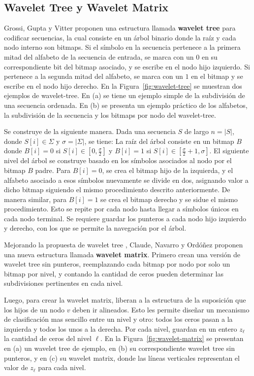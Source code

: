\subsection{Wavelet Tree y Wavelet Matrix}
Grossi, Gupta y Vitter \cite{grossi2003high} proponen una estructura llamada \textbf{wavelet tree} para codificar secuencias, la cual consiste en un árbol binario donde la raíz y cada nodo interno son bitmaps. Si el símbolo en la secuencia pertenece a la primera mitad del alfabeto de la secuencia de entrada, se marca con un $0$ en su correspondiente bit del bitmap asociado, y se escribe en el nodo hijo izquierdo. Si pertenece a la segunda mitad del alfabeto, se marca con un $1$ en el bitmap y se escribe en el nodo hijo derecho. En la Figura~\ref{fig:wavelet-tree} se muestran dos ejemplos de wavelet-tree. En (a) se tiene un ejemplo simple de la subdivisión de una secuencia ordenada. En (b) se presenta un ejemplo práctico de los alfabetos, la subdivisión de la secuencia y los bitmaps por nodo del wavelet-tree.



Se construye de la siguiente manera. Dada una secuencia $S$ de largo $n = |S|$, donde $S[i] \in \Sigma$ y $\sigma = |\Sigma|$, se tiene: La raíz del árbol consiste en un bitmap $B$ donde $B[i] = 0$ si $S[i] \in [0, \frac{\sigma}{2}]$ y $B[i] = 1$ si $S[i] \in [\frac{\sigma}{2} + 1, \sigma]$. El siguiente nivel del árbol se construye basado en los símbolos asociados al nodo por el bitmap $B$ padre. Para $B[i] = 0$, se crea el bitmap hijo de la izquierda, y el alfabeto asociado a esos símbolos nuevamente se divide en dos, asignando valor a dicho bitmap siguiendo el mismo procedimiento descrito anteriormente. De manera similar, para $B[i] = 1$ se crea el bitmap derecho y se sidue el mismo procedimiento. Esto se repite por cada nodo hasta llegar a símbolos únicos en cada nodo terminal. Se requiere guardar los punteros a cada nodo hijo izquierdo y derecho, con los que se permite la navegación por el árbol.

Mejorando la propuesta de wavelet tree \cite{grossi2003high}, Claude, Navarro y Ordóñez \cite{claude2015wavelet} proponen una nueva estructura llamada \textbf{wavelet matrix}. Primero crean una versión de wavelet tree sin punteros, reemplazando cada bitmap por nodo por solo un bitmap por nivel, y contando la cantidad de ceros pueden determinar las subdivisiones pertinentes en cada nivel. 

Luego, para crear la wavelet matrix, liberan a la estructura de la suposición que los hijos de un nodo $v$ deben ir alineados. Esto les permite diseñar un mecanismo de clasificación mas sencillo entre un nivel y otro: todos los ceros pasan a la izquierda y todos los unos a la derecha. Por cada nivel, guardan en un entero $z_{\ell}$ la cantidad de ceros del nivel $\ell$. En la Figura~\ref{fig:wavelet-matrix} se presentan en (a) un wavelet tree de ejemplo, en (b) su correspondiente wavelet tree sin punteros, y en (c) su wavelet matrix, donde las líneas verticales representan el valor de $z_{\ell}$ para cada nivel.

